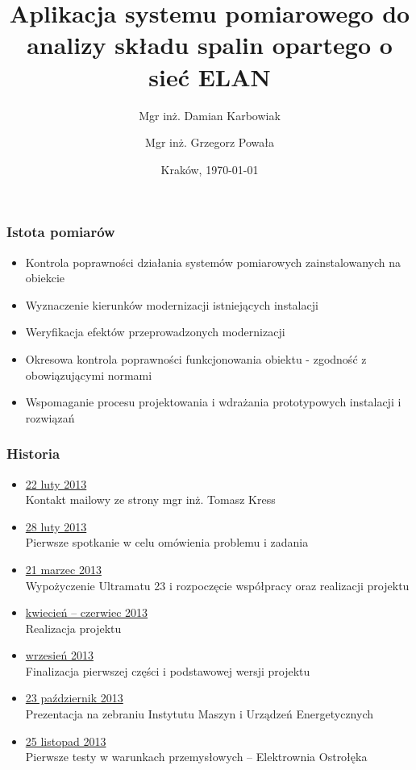 \documentclass[ucs]{beamer}
\title[Gas Analyzer]{Aplikacja systemu pomiarowego do analizy składu spalin opartego o sieć ELAN}
\author[D. Karbowiak, G. Powała]{Mgr inż. Damian Karbowiak  \and Mgr inż. Grzegorz Powała}
\institute[Politechnika Śl.]{\large Politechnika Śląska \\\vspace{0.5cm} \texttt{[image: images/PolslLogo]} }
\date{Kraków, \today}
\begin{document}
\begin{frame}
  \titlepage
\end{frame}

\begin{frame}
\frametitle{Istota pomiarów}
\begin{itemize}
\setlength{\itemsep}{5pt}
\setlength{\parskip}{5pt}
\setlength{\parsep}{5pt}
\item Kontrola poprawności działania systemów pomiarowych zainstalowanych na obiekcie
\item Wyznaczenie kierunków modernizacji istniejących instalacji
\item Weryfikacja efektów przeprowadzonych modernizacji
\item Okresowa kontrola poprawności funkcjonowania obiektu - zgodność z obowiązującymi normami
\item Wspomaganie procesu projektowania i wdrażania prototypowych instalacji i rozwiązań
\end{itemize}
\end{frame}

\begin{frame}
\frametitle{Historia}
\vspace{-2mm}
\begin{itemize}
\setlength{\itemsep}{0pt}
\setlength{\parskip}{0pt}
\setlength{\parsep}{0pt}
\item \underline{22 luty 2013} \\
Kontakt mailowy ze strony mgr inż. Tomasz Kress
\item \underline{28 luty 2013} \\
Pierwsze spotkanie w celu omówienia problemu i zadania
\item \underline{21 marzec 2013} \\
Wypożyczenie Ultramatu 23 i rozpoczęcie współpracy oraz realizacji projektu
\item \underline{kwiecień -- czerwiec 2013} \\
Realizacja projektu
\item \underline{wrzesień 2013} \\
Finalizacja pierwszej części i podstawowej wersji projektu
\item \underline{23 październik 2013} \\
Prezentacja na zebraniu Instytutu Maszyn i Urządzeń Energetycznych
\item \underline{25 listopad 2013} \\
Pierwsze testy w warunkach przemysłowych -- Elektrownia Ostrołęka
\end{itemize}
\end{frame}
\end{document}
